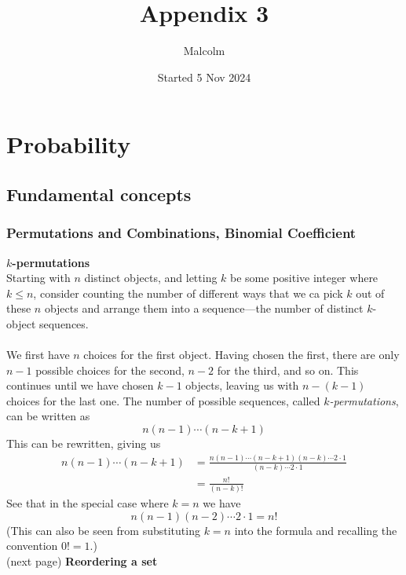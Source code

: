 \documentclass{report}
\title{Appendix 3}
\date{Started 5 Nov 2024}
\author{Malcolm}
\begin{document}
\maketitle

\tableofcontents

\appendix
\chapter{Probability}

\section{Fundamental concepts}

\subsection{Permutations and Combinations, Binomial Coefficient}
\textbf{$k$-permutations}\\
Starting with $n$ distinct objects, and letting $k$ be some positive integer where $k\leq n$, 
consider counting the number of different ways that we ca  pick $k$ out of these $n$ objects and arrange them
into a sequence---the number of distinct $k$-object sequences.\\
\vspace{1mm}\\
We first have $n$ choices for the first object. 
Having chosen the first, there are only $n-1$ possible choices for the second, $n-2$ for the third, and so on.
This continues until we have chosen $k-1$ objects, leaving us with $n-(k-1)$ choices for the last one. The 
number of possible sequences, called \textit{$k$-permutations}, can be written as
\begin{equation*}
n(n-1)\cdots(n-k+1)
\end{equation*}
This can be rewritten, giving us
\begin{align*}
n(n-1)\cdots(n-k+1)&=\frac{n(n-1)\cdots(n-k+1)(n-k)\cdots2\cdot1}{(n-k)\cdots2\cdot1}\\
&=\frac{n!}{(n-k)!}
\end{align*}
See that in the special case where $k=n$ we have
\begin{equation*}
n(n-1)(n-2)\cdots2\cdot1=n!
\end{equation*}
(This can also be seen from substituting $k=n$ into the formula and recalling the convention $0!=1$.)\\
(next page)
\newpage
\noindent\textbf{Reordering a set}\\
\end{document}
